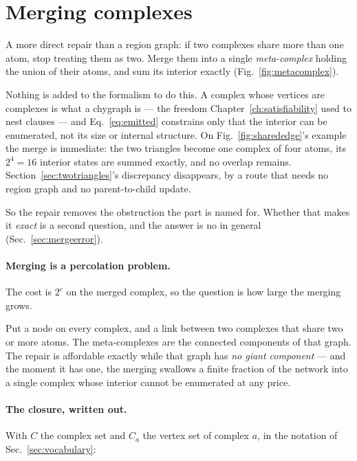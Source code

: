 \section{Merging complexes}
\label{sec:merging}

A more direct repair than a region graph: if two complexes share more than one
atom, stop treating them as two. Merge them into a single \emph{meta-complex}
holding the union of their atoms, and sum its interior exactly
(Fig.~\ref{fig:metacomplex}).

Nothing is added to the formalism to do this. A complex whose vertices are
complexes is what a chygraph is --- the freedom Chapter~\ref{ch:satisfiability}
used to nest clauses --- and Eq.~\eqref{eq:emitted} constrains only that the
interior can be enumerated, not its size or internal structure. On
Fig.~\ref{fig:sharededge}'s example the merge is immediate: the two triangles
become one complex of four atoms, its $2^{4}=16$ interior states are summed
exactly, and no overlap remains. Section~\ref{sec:twotriangles}'s discrepancy
disappears, by a route that needs no region graph and no parent-to-child
update.

So the repair removes the obstruction the part is named for. Whether that makes
it \emph{exact} is a second question, and the answer is no in general
(Sec.~\ref{sec:mergeerror}).

\paragraph{Merging is a percolation problem.} The cost is $2^{c}$ on the merged
complex, so the question is how large the merging grows.

Put a node on every complex, and a link between two complexes that share two or
more atoms. The meta-complexes are the connected components of that graph. The
repair is affordable exactly while that graph has \emph{no giant component} ---
and the moment it has one, the merging swallows a finite fraction of the network
into a single complex whose interior cannot be enumerated at any price.

\paragraph{The closure, written out.} With $C$ the complex set and $C_{a}$ the
vertex set of complex $a$, in the notation of Sec.~\ref{sec:vocabulary}:

